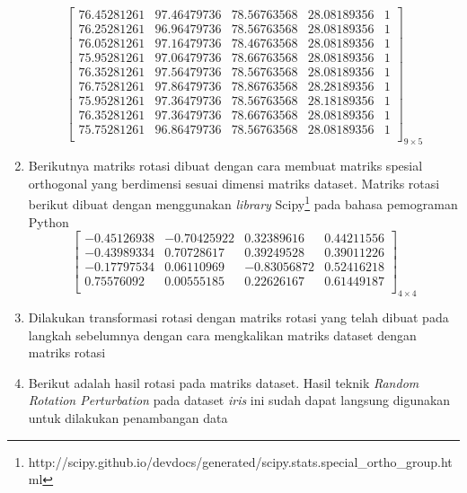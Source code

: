 \begin{enumerate}
    \[
        \begin{bmatrix}
            76.45281261  & 97.46479736 &  78.56763568 &  28.08189356 & 1 \\
            76.25281261  & 96.96479736 &  78.56763568 &  28.08189356 & 1 \\
            76.05281261  & 97.16479736 &  78.46763568 &  28.08189356 & 1 \\
            75.95281261  & 97.06479736 &  78.66763568 &  28.08189356 & 1 \\
            76.35281261  & 97.56479736 &  78.56763568 &  28.08189356 & 1 \\
            76.75281261  & 97.86479736 &  78.86763568 &  28.28189356 & 1 \\
            75.95281261  & 97.36479736 &  78.56763568 &  28.18189356 & 1 \\
            76.35281261  & 97.36479736 &  78.66763568 &  28.08189356 & 1 \\
            75.75281261  & 96.86479736 &  78.56763568 &  28.08189356 & 1 \\
        \end{bmatrix}_{9\times 5}
    \]
    \item Berikutnya matriks rotasi dibuat dengan cara membuat matriks spesial orthogonal yang berdimensi sesuai dimensi matriks dataset. Matriks rotasi berikut dibuat dengan menggunakan \textit{library} Scipy\footnote{http://scipy.github.io/devdocs/generated/scipy.stats.special\_ortho\_group.html} pada bahasa pemograman Python
    \[
        \begin{bmatrix}
            -0.45126938		&		-0.70425922		&		 0.32389616		&		0.44211556 \\
            -0.43989334		&		 0.70728617		&		 0.39249528		&		0.39011226 \\
            -0.17797534		&		 0.06110969		&		-0.83056872		&		0.52416218 \\
             0.75576092		&		 0.00555185		&		 0.22626167		&		0.61449187 \\
        \end{bmatrix}_{4\times 4}
    \]
    \item Dilakukan transformasi rotasi dengan matriks rotasi yang telah dibuat pada langkah sebelumnya dengan cara mengkalikan matriks dataset dengan matriks rotasi
    \item Berikut adalah hasil rotasi pada matriks dataset. Hasil teknik \textit{Random Rotation Perturbation} pada dataset \textit{iris} ini sudah dapat langsung digunakan untuk dilakukan penambangan data

\end{enumerate}
